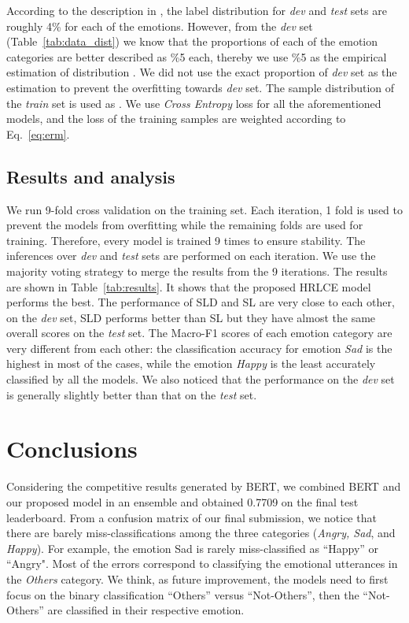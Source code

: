 \documentclass[11pt,a4paper]{article}
\begin{document}
According to the description in \cite{competition}, the label distribution for \textit{dev} and \textit{test} sets are roughly 4\% for each of the emotions. However, from the \textit{dev} set (Table~\ref{tab:data_dist}) we know that the proportions of each of the emotion categories are better described as \%5 each, thereby we use \%5 as the empirical estimation of distribution . We did not use the exact proportion of \textit{dev} set as the estimation to prevent the overfitting towards \textit{dev} set. The sample distribution of the \textit{train} set is used as . We use \emph{Cross Entropy} loss for all the aforementioned models, and the loss of the training samples are weighted according to Eq.~\ref{eq:erm}.



\subsection{Results and analysis}
We run 9-fold cross validation on the training set. Each iteration, 1 fold is used to prevent the models from overfitting while the remaining folds are used for training. Therefore, every model is trained 9 times to ensure  stability. The inferences over \emph{dev} and \emph{test} sets are performed on each iteration. We use the majority voting strategy to merge the results from the 9 iterations. The results are shown in Table~\ref{tab:results}. It shows that the proposed HRLCE model performs the best.
The performance of SLD and SL are very close to each other, on the \emph{dev} set, SLD performs better than SL but they have almost the same overall scores on the \emph{test} set. The Macro-F1 scores of each emotion category are very different from each other: the classification accuracy for emotion \emph{Sad} is the highest in most of the cases, while the emotion \emph{Happy} is the least accurately classified by all the models. We also noticed that the performance on the \emph{dev} set is generally slightly better than that on the \emph{test} set. 

\section{Conclusions}
Considering the competitive results generated by BERT, we combined BERT and our proposed model in an ensemble and obtained 0.7709 on the final test leaderboard.
From a confusion matrix of our final submission, we notice that there are barely miss-classifications among the three categories  (\emph{Angry, Sad}, and \emph{Happy}). For example, the emotion Sad is rarely miss-classified as ``Happy'' or ``Angry".  
Most of the errors correspond to classifying the emotional utterances in the \emph{Others} category.
We think, as future improvement, the models need to first focus on the binary classification ``Others'' versus ``Not-Others'', then the ``Not-Others'' are classified in their respective emotion. 

\newpage



\end{document}
